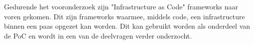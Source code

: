Gedurende het vooronderzoek zijn \string"Infrastructure as Code\string" frameworks naar voren gekomen. Dit zijn frameworks waarmee, middels code, een infrastructure binnen een \acrshort{paas} opgezet kan worden. Dit kan gebruikt worden als onderdeel van de PoC en wordt in een van de deelvragen verder onderzocht.





